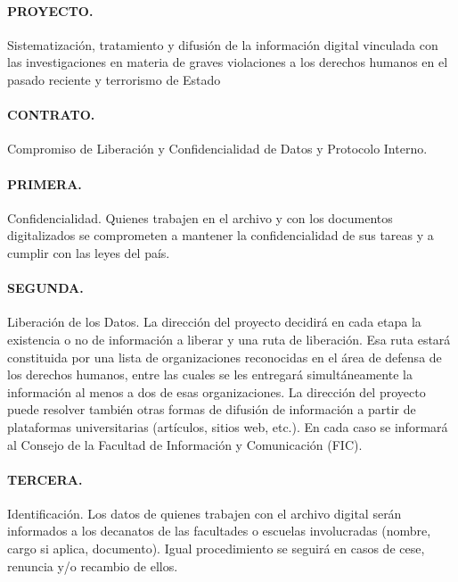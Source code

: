 \documentclass{article}
\begin{document}
\paragraph{PROYECTO.} Sistematización, tratamiento y difusión de la información digital vinculada con las investigaciones en materia de graves violaciones a los derechos humanos en el pasado reciente y terrorismo de Estado

\paragraph{CONTRATO.} Compromiso de Liberación y Confidencialidad de Datos y Protocolo Interno.\\

\paragraph{PRIMERA.} Confidencialidad. Quienes trabajen en el archivo y con los documentos digitalizados se comprometen a mantener la confidencialidad de sus tareas y a cumplir con las leyes del país.\\

\paragraph{SEGUNDA.} Liberación de los Datos. La dirección del proyecto decidirá en cada etapa la existencia o no de información a liberar y una ruta de liberación. Esa ruta estará constituida por una lista de organizaciones reconocidas en el área de defensa de los derechos humanos, entre las cuales se les entregará simultáneamente la información al menos a dos de esas organizaciones. La dirección del proyecto puede resolver también otras formas de difusión de información a partir de plataformas universitarias (artículos, sitios web, etc.). En cada caso se informará al Consejo de la Facultad de Información y Comunicación (FIC).\\

\paragraph{TERCERA.} Identificación. Los datos de quienes trabajen con el archivo digital serán informados a los decanatos de las facultades o escuelas involucradas (nombre, cargo si aplica, documento). Igual procedimiento se seguirá en casos de cese, renuncia y/o recambio de ellos.\\
\end{document}
